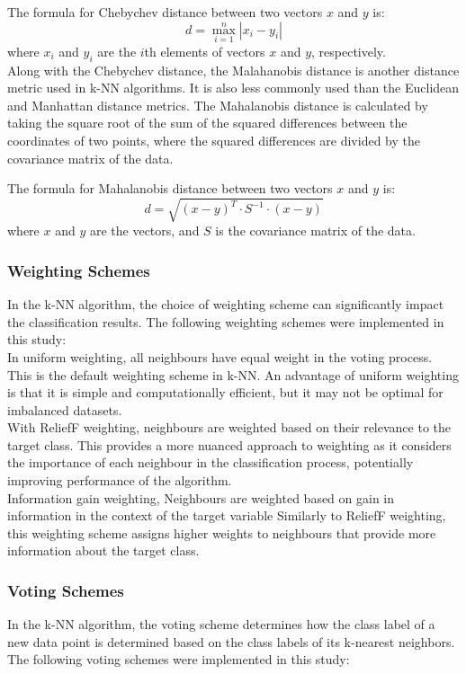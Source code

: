 The formula for Chebychev distance between two vectors \(x\) and \(y\) is:
\[ d = \max_{i=1}^{n} |x_i - y_i| \]
where \(x_i\) and \(y_i\) are the \(i\)th elements of vectors \(x\) and \(y\), respectively.\\

Along with the Chebychev distance, the Malahanobis distance is another distance metric used in k-NN algorithms.
It is also less commonly used than the Euclidean and Manhattan distance metrics.
The Mahalanobis distance is calculated by taking the square root of the sum of the squared differences between the coordinates of two points,
where the squared differences are divided by the covariance matrix of the data.

The formula for Mahalanobis distance between two vectors \(x\) and \(y\) is:
\[ d = \sqrt{(x - y)^T \cdot S^{-1} \cdot (x - y)} \]
where \(x\) and \(y\) are the vectors, and \(S\) is the covariance matrix of the data.\\

\subsubsection*{Weighting Schemes}
In the k-NN algorithm, the choice of weighting scheme can significantly impact the classification results.
The following weighting schemes were implemented in this study:\\

In uniform weighting, all neighbours have equal weight in the voting process.
This is the default weighting scheme in k-NN.
An advantage of uniform weighting is that it is simple and computationally efficient, but it may not be optimal for imbalanced datasets.\\

With ReliefF weighting, neighbours are weighted based on their relevance to the target class.
This provides a more nuanced approach to weighting as it considers the importance of each neighbour in the classification process, potentially
improving performance of the algorithm.\\

Information gain weighting, Neighbours are weighted based on gain in information in the context of the target variable\cite{brownlee2019}
Similarly to ReliefF weighting, this weighting scheme assigns higher weights to neighbours that provide more information about the target class.\\

\subsubsection*{Voting Schemes}
In the k-NN algorithm, the voting scheme determines how the class label of a new data point is determined based on the class labels of its k-nearest neighbors.
The following voting schemes were implemented in this study:\\

